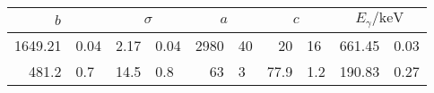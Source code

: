 \label{tab:b}
	\begin{tabular}{r@{${}\pm{}$}lr@{${}\pm{}$}lr@{${}\pm{}$}lr@{${}\pm{}$}lr@{${}\pm{}$}l}
		\toprule
		\multicolumn{2}{c}{$b$} & \multicolumn{2}{c}{$\sigma$} & \multicolumn{2}{c}{$a$} & \multicolumn{2}{c}{$c$} & \multicolumn{2}{c}{$E_\gamma/\si{\kilo\electronvolt}$} \\
		\midrule
		1649.21 & 0.04 & 2.17  & 0.04 & 2980 & 40 & 20   & 16  & 661.45 & 0.03 \\
		481.2   & 0.7  & 14.5  & 0.8  &   63 &  3 & 77.9 & 1.2 & 190.83 & 0.27 \\
		\bottomrule
	\end{tabular}
